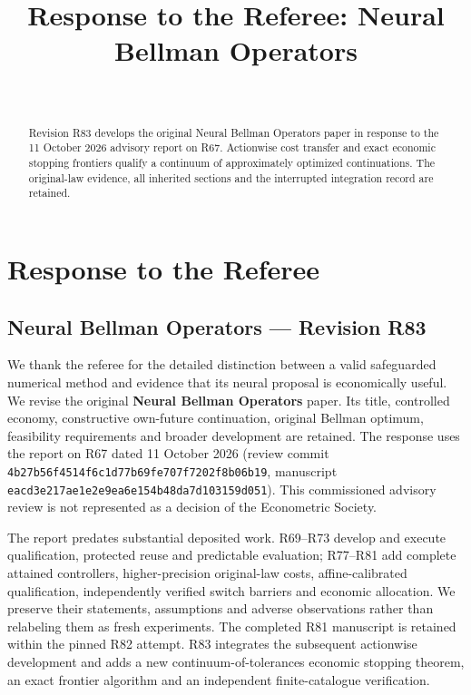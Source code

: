 \documentclass[ecta,nameyear,draft]{econsocart}
\begin{document}
\begin{frontmatter}
\title{Response to the Referee: Neural Bellman Operators}
\begin{aug}
\author[id=au1,addressref={add1}]{~}
\address[id=add1]{Peking University}
\end{aug}
\begin{abstract}Revision R83 develops the original Neural Bellman Operators paper in response to the 11 October 2026 advisory report on R67. Actionwise cost transfer and exact economic stopping frontiers qualify a continuum of approximately optimized continuations. The original-law evidence, all inherited sections and the interrupted integration record are retained.\end{abstract}
\end{frontmatter}
\providecommand{\tightlist}{\setlength{\itemsep}{0pt}\setlength{\parskip}{0pt}}
\hypertarget{response-to-the-referee}{%
\section{Response to the Referee}\label{response-to-the-referee}}

\hypertarget{neural-bellman-operators-revision-r83}{%
\subsection{Neural Bellman Operators --- Revision
R83}\label{neural-bellman-operators-revision-r83}}

We thank the referee for the detailed distinction between a valid
safeguarded numerical method and evidence that its neural proposal is
economically useful. We revise the original \textbf{Neural Bellman
Operators} paper. Its title, controlled economy, constructive own-future
continuation, original Bellman optimum, feasibility requirements and
broader development are retained. The response uses the report on R67
dated 11 October 2026 (review commit
\nolinkurl{4b27b56f4514f6c1d77b69fe707f7202f8b06b19}, manuscript
\nolinkurl{eacd3e217ae1e2e9ea6e154b48da7d103159d051}). This commissioned
advisory review is not represented as a decision of the Econometric
Society.

The report predates substantial deposited work. R69--R73 develop and
execute qualification, protected reuse and predictable evaluation;
R77--R81 add complete attained controllers, higher-precision
original-law costs, affine-calibrated qualification, independently
verified switch barriers and economic allocation. We preserve their
statements, assumptions and adverse observations rather than relabeling
them as fresh experiments. The completed R81 manuscript is retained
within the pinned R82 attempt. R83 integrates the subsequent actionwise
development and adds a new continuum-of-tolerances economic stopping
theorem, an exact frontier algorithm and an independent finite-catalogue
verification.
\end{document}
